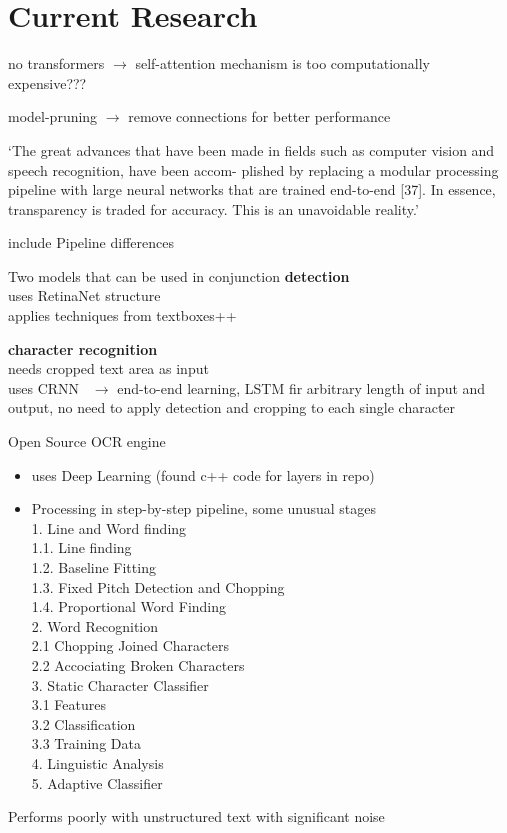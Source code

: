 \chapter{Current Research}\label{ch:research}
no transformers $\rightarrow$ self-attention mechanism is too computationally expensive???

model-pruning $\rightarrow$ remove connections for better performance

`The great advances that have been made in fields such as computer vision and speech recognition,
have been accom- plished by replacing a modular processing pipeline with large neural networks
that are trained end-to-end [37]. In essence, transparency is traded for accuracy.
This is an unavoidable reality.'\citep{arpteg_software_2018}

include Pipeline differences


Two models that can be used in conjunction
\textbf{detection}~\citep{beom_text_2021}\\
uses RetinaNet structure~\citep{lin_focal_2018}\\
applies techniques from textboxes++~\citep{liao_textboxes_2018}

\textbf{character recognition}~\citep{beom_crnn_2021}\\
needs cropped text area as input\\
uses CRNN~\citep{shi_end--end_2015} $\rightarrow$ end-to-end learning, LSTM fir arbitrary length of
input and output, no need to apply detection and cropping to each single character

Open Source OCR engine~\citep{smith_overview_2007}
\begin{itemize}
    \item uses Deep Learning (found c++ code for layers in repo)
    \item Processing in step-by-step pipeline, some unusual stages\\
        1. Line and Word finding\\
        1.1. Line finding\\
        1.2. Baseline Fitting\\
        1.3. Fixed Pitch Detection and Chopping\\
        1.4. Proportional Word Finding\\
        2. Word Recognition\\
        2.1 Chopping Joined Characters\\
        2.2 Accociating Broken Characters\\
        3. Static Character Classifier\\
        3.1 Features\\
        3.2 Classification\\
        3.3 Training Data\\
        4. Linguistic Analysis\\
        5. Adaptive Classifier
\end{itemize}
Performs poorly with unstructured text with significant noise

